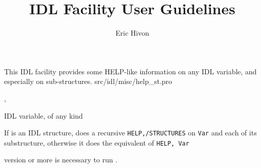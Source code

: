 

\sloppy

\title{\healpix IDL Facility User Guidelines}
 \section[help\_st]{ }
\label{idl:help_st}
\author{Eric Hivon}

\begin{facility}
{This IDL facility provides some HELP-like information on any IDL variable,
and especially on sub-structures.}
{src/idl/misc/help\_st.pro}
\end{facility}

\begin{IDLformat}
{\thedocid,
}
\end{IDLformat}

\begin{qualifiers}
  \begin{qulist}{} %
    \item[Var] %
	IDL variable, of any kind
  \end{qulist}
\end{qualifiers}


\begin{codedescription}
{%
If  is an IDL structure, \thedocid{} does a recursive \texttt{HELP,/STRUCTURES} on \texttt{Var} and each of its substructure, otherwise it does the equivalent of \texttt{HELP, Var}}
\end{codedescription}



\begin{related}
  \begin{sulist}{} %
    \item[idl] version \idlversion or more is necessary to run \thedocid.
  \end{sulist}
\end{related}

